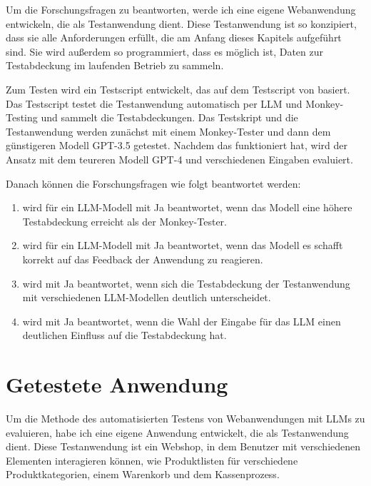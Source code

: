 
Um die Forschungsfragen zu beantworten, werde ich eine eigene Webanwendung entwickeln, die als Testanwendung dient.
Diese Testanwendung ist so konzipiert, dass sie alle Anforderungen erfüllt, die am Anfang dieses Kapitels aufgeführt sind.
Sie wird außerdem so programmiert, dass es möglich ist, Daten zur Testabdeckung im laufenden Betrieb zu sammeln.


Zum Testen wird ein Testscript entwickelt, das auf dem Testscript von  basiert.
Das Testscript testet die Testanwendung automatisch per LLM und Monkey-Testing und sammelt die Testabdeckungen.
Das Testskript und die Testanwendung werden zunächst mit einem Monkey-Tester und dann dem günstigeren Modell GPT-3.5 getestet.
Nachdem das funktioniert hat, wird der Ansatz mit dem teureren Modell GPT-4 und verschiedenen Eingaben evaluiert.

Danach können die Forschungsfragen wie folgt beantwortet werden:

\begin{enumerate}
    \item wird für ein LLM-Modell mit \glqq{}Ja\grqq{} beantwortet, wenn das Modell eine höhere Testabdeckung erreicht als der Monkey-Tester.
    \item wird für ein LLM-Modell mit \glqq{}Ja\grqq{} beantwortet, wenn das Modell es schafft korrekt auf das Feedback der Anwendung zu reagieren.
    \item wird mit \glqq{}Ja\grqq{} beantwortet, wenn sich die Testabdeckung der Testanwendung mit verschiedenen LLM-Modellen deutlich unterscheidet.
    \item wird mit \glqq{}Ja\grqq{} beantwortet, wenn die Wahl der Eingabe für das LLM einen deutlichen Einfluss auf die Testabdeckung hat.
\end{enumerate}



\section{Getestete Anwendung}

Um die Methode des automatisierten Testens von Webanwendungen mit LLMs zu evaluieren, habe ich eine eigene Anwendung entwickelt, die als Test\-an\-wen\-dung dient.
Diese Test\-anwendung ist ein Webshop, in dem Benutzer mit verschiedenen Elementen interagieren können, wie Produktlisten für verschiedene Produktkategorien, einem Warenkorb und dem Kassenprozess.

